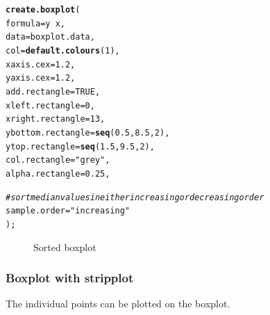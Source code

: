 \documentclass[letterpaper]{report}\usepackage[]{graphicx}\usepackage[]{color}
\makeatletter
\newcommand{\hlnum}[1]{\textcolor[rgb]{0.686,0.059,0.569}{#1}}%
\newcommand{\hlstr}[1]{\textcolor[rgb]{0.192,0.494,0.8}{#1}}%
\newcommand{\hlcom}[1]{\textcolor[rgb]{0.678,0.584,0.686}{\textit{#1}}}%
\newcommand{\hlopt}[1]{\textcolor[rgb]{0,0,0}{#1}}%
\newcommand{\hlstd}[1]{\textcolor[rgb]{0.345,0.345,0.345}{#1}}%
\newcommand{\hlkwc}[1]{\textcolor[rgb]{0.333,0.667,0.333}{#1}}%
\newcommand{\hlkwd}[1]{\textcolor[rgb]{0.737,0.353,0.396}{\textbf{#1}}}%
\newenvironment{kframe}{%
 \def\at@end@of@kframe{}%
 \ifinner\ifhmode%
  \def\at@end@of@kframe{\end{minipage}}%
  \begin{minipage}{\columnwidth}%
 \fi\fi%
 \def\FrameCommand##1{\hskip\@totalleftmargin \hskip-\fboxsep
 \colorbox{shadecolor}{##1}\hskip-\fboxsep
     \hskip-\linewidth \hskip-\@totalleftmargin \hskip\columnwidth}%
 \MakeFramed {\advance\hsize-\width
   \@totalleftmargin\z@ \linewidth\hsize
   \@setminipage}}%
 {\par\unskip\endMakeFramed%
 \at@end@of@kframe}
\newenvironment{knitrout}{}{} %
\makeatother
\begin{document}
\begin{knitrout}
\color{fgcolor}\begin{kframe}
\begin{alltt}
\hlkwd{create.boxplot}\hlstd{(}
    \hlkwc{formula} \hlstd{= y} \hlopt{~} \hlstd{x,}
    \hlkwc{data} \hlstd{= boxplot.data,}
    \hlkwc{col} \hlstd{=} \hlkwd{default.colours}\hlstd{(}\hlnum{1}\hlstd{),}
    \hlkwc{xaxis.cex} \hlstd{=} \hlnum{1.2}\hlstd{,}
    \hlkwc{yaxis.cex} \hlstd{=} \hlnum{1.2}\hlstd{,}
    \hlkwc{add.rectangle} \hlstd{=} \hlnum{TRUE}\hlstd{,}
    \hlkwc{xleft.rectangle} \hlstd{=} \hlnum{0}\hlstd{,}
    \hlkwc{xright.rectangle} \hlstd{=} \hlnum{13}\hlstd{,}
    \hlkwc{ybottom.rectangle} \hlstd{=} \hlkwd{seq}\hlstd{(}\hlnum{0.5}\hlstd{,} \hlnum{8.5}\hlstd{,} \hlnum{2}\hlstd{),}
    \hlkwc{ytop.rectangle} \hlstd{=} \hlkwd{seq}\hlstd{(}\hlnum{1.5}\hlstd{,} \hlnum{9.5}\hlstd{,} \hlnum{2}\hlstd{),}
    \hlkwc{col.rectangle} \hlstd{=} \hlstr{"grey"}\hlstd{,}
    \hlkwc{alpha.rectangle} \hlstd{=} \hlnum{0.25}\hlstd{,}

    \hlcom{# sort median values in either increasing or decreasing order}
    \hlkwc{sample.order} \hlstd{=} \hlstr{"increasing"}
    \hlstd{);}
\end{alltt}
\end{kframe}\begin{figure}

{\centering {} 

}

\caption[Sorted boxplot]{Sorted boxplot}\label{fig:boxplot4}
\end{figure}


\end{knitrout}

\subsubsection{Boxplot with stripplot}
The individual points can be plotted on the boxplot.
\end{document}
